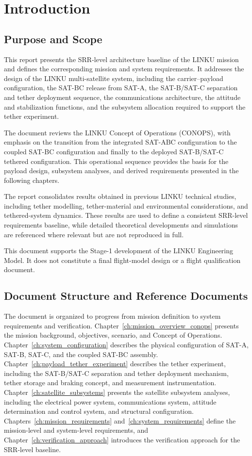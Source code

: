 \chapter{Introduction}
\label{ch:introduction}

\section{Purpose and Scope}
\label{sec:purpose_scope}
This report presents the SRR-level architecture baseline of the LINKU mission and defines the corresponding mission and system requirements. It addresses the design of the LINKU multi-satellite system, including the carrier--payload configuration, the SAT-BC release from SAT-A, the SAT-B/SAT-C separation and tether deployment sequence, the communications architecture, the attitude and stabilization functions, and the subsystem allocation required to support the tether experiment.

The document reviews the LINKU Concept of Operations (CONOPS), with emphasis on the transition from the integrated SAT-ABC configuration to the coupled SAT-BC configuration and finally to the deployed SAT-B/SAT-C tethered configuration. This operational sequence provides the basis for the payload design, subsystem analyses, and derived requirements presented in the following chapters.

The report consolidates results obtained in previous LINKU technical studies, including tether modelling, tether-material and environmental considerations, and tethered-system dynamics. These results are used to define a consistent SRR-level requirements baseline, while detailed theoretical developments and simulations are referenced where relevant but are not reproduced in full.

This document supports the Stage-1 development of the LINKU Engineering Model. It does not constitute a final flight-model design or a flight qualification document.

\section{Document Structure and Reference Documents}
\label{sec:document_structure_references}
The document is organized to progress from mission definition to system requirements and verification. Chapter~\ref{ch:mission_overview_conops} presents the mission background, objectives, scenario, and Concept of Operations. Chapter~\ref{ch:system_configuration} describes the physical configuration of SAT-A, SAT-B, SAT-C, and the coupled SAT-BC assembly. Chapter~\ref{ch:payload_tether_experiment} describes the tether experiment, including the SAT-B/SAT-C separation and tether deployment mechanism, tether storage and braking concept, and measurement instrumentation. Chapter~\ref{ch:satellite_subsystems} presents the satellite subsystem analyses, including the electrical power system, communications system, attitude determination and control system, and structural configuration. Chapters~\ref{ch:mission_requirements} and~\ref{ch:system_requirements} define the mission-level and system-level requirements, and Chapter~\ref{ch:verification_approach} introduces the verification approach for the SRR-level baseline.

